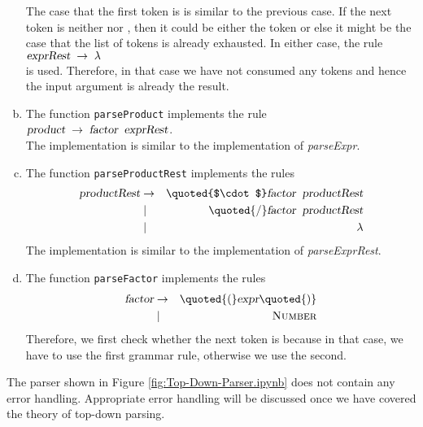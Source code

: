 \begin{enumerate}[(a)]
      The case that the first token is \squoted{-} is similar to the previous case.
      If the next token is neither \squoted{+} nor \squoted{-}, then it could be either the
      token \squoted{)} or else it might be the case that the list of tokens is already
      exhausted.  In either case, the rule
      \\[0.2cm]
      \hspace*{1.3cm}
      $\textsl{exprRest} \;\rightarrow\; \lambda$
      \\[0.2cm]
      is used.  Therefore, in that case we have not consumed any tokens and hence
      the input argument is already the result.
\item The function \texttt{parseProduct} implements the rule
      \\[0.2cm]
      \hspace*{1.3cm}
      $\textsl{product} \;\rightarrow\; \textsl{factor} \;\; \textsl{exprRest}$.
      \\[0.2cm]
      The implementation is similar to the implementation of \textsl{parseExpr}.
\item The function \texttt{parseProductRest} implements the rules
      \begin{eqnarray*}
      \textsl{productRest} & \rightarrow & \quoted{$\cdot$} \textsl{factor}\;\;\textsl{productRest} \\
                       & \mid        & \quoted{/} \textsl{factor}\;\;\textsl{productRest}     \\
                       & \mid        & \;\lambda                                      
      \end{eqnarray*}
      The implementation is similar to the implementation of \textsl{parseExprRest}.
\item The function \texttt{parseFactor} implements the rules
      \begin{eqnarray*}
      \textsl{factor} & \rightarrow & \quoted{(} \textsl{expr} \quoted{)} \\
                      & \mid        & \;\textsc{Number} 
      \end{eqnarray*}
      Therefore, we first check whether the next token is \squoted{(} because in that case,
      we have to use the first grammar rule, otherwise we use the second.
\end{enumerate}
The parser shown in Figure \ref{fig:Top-Down-Parser.ipynb} does not contain any error handling. 
Appropriate error handling will be discussed once we have covered the theory of top-down parsing.

